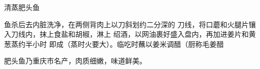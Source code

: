 \begin{recipe}{清蒸肥头鱼}

\ingredients





\cooking

鱼杀后去内脏洗净，在两侧背肉上以刀斜划约二分深的 刀线，将口蘑和火腿片镶入刀线内，抹上食盐和胡椒，淋上 绍酒，以网油裹好盛入盘内，再加进姜片和黄葱蒸约半小时 即成（蒸时火要大）。临吃时蘸以姜米调醋（厨称毛姜醋

\notes

肥头鱼乃重庆市名产，肉质细嫩，味道鲜美。

\end{recipe}

